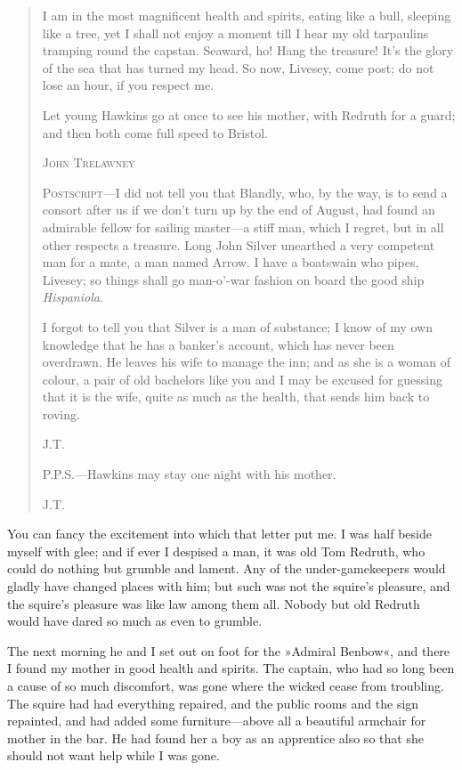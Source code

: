 \begin{quotation}
I am in the most magnificent health and spirits, eating like a bull, sleeping like a tree, yet I shall not enjoy a moment till I hear my old tarpaulins tramping round the capstan. Seaward, ho! Hang the treasure! It's the glory of the sea that has turned my head. So now, Livesey, come post; do not lose an hour, if you respect me.

Let young Hawkins go at once to see his mother, with Redruth for a guard; and then both come full speed to Bristol.
\begin{flushright}
\textsc{John Trelawney}
\end{flushright}
\enlargethispage{2\baselineskip}


\textsc{Postscript}—I did not tell you that Blandly, who, by the way, is to send a consort after us if we don't turn up by the end of August, had found an admirable fellow for sailing master—a stiff man, which I regret, but in all other respects a treasure. Long John Silver unearthed a very competent man for a mate, a man named Arrow. I have a boatswain who pipes, Livesey; so things shall go man-o'-war fashion on board the good ship \textit{Hispaniola}.

I forgot to tell you that Silver is a man of substance; I know of my own knowledge that he has a banker's account, which has never been overdrawn. He leaves his wife to manage the inn; and as she is a woman of colour, a pair of old bachelors like you and I may be excused for guessing that it is the wife, quite as much as the health, that sends him back to roving.
\begin{flushright}
\textsc{J.T.}
\end{flushright}

\textsc{P.P.S.}—Hawkins may stay one night with his mother.\\
\begin{flushright}
\textsc{J.T.}
\end{flushright}

\end{quotation}

You can fancy the excitement into which that letter put me. I was half beside myself with glee; and if ever I despised a man, it was old Tom Redruth, who could do nothing but grumble and lament. Any of the under-gamekeepers would gladly have changed places with him; but such was not the squire's pleasure, and the squire's pleasure was like law among them all. Nobody but old Redruth would have dared so much as even to grumble.

The next morning he and I set out on foot for the »Admiral Benbow«, and there I found my mother in good health and spirits. The captain, who had so long been a cause of so much discomfort, was gone where the wicked cease from troubling. The squire had had everything repaired, and the public rooms and the sign repainted, and had added some furniture—above all a beautiful armchair for mother in the bar. He had found her a boy as an apprentice also so that she should not want help while I was gone.

